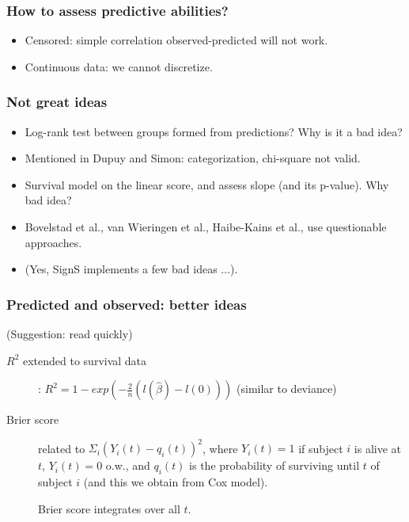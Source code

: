 \begin{frame}
\frametitle{How to assess predictive abilities?}
\begin{itemize}
\item Censored: simple correlation observed-predicted will not work.
\item Continuous data: we cannot discretize.
\end{itemize}
\end{frame}


\begin{frame}
\frametitle{Not great ideas}

\begin{itemize}
\item Log-rank test between groups formed from predictions? Why is it a
  bad idea?
\pause
\item Mentioned in Dupuy and Simon: categorization, chi-square not valid.
\vspace*{10pt}
\pause
\item Survival model on the linear score, and assess slope (and its
  p-value). Why bad idea?
\vspace*{10pt}
\pause
\item Bovelstad et al., van Wieringen et al., Haibe-Kains et al., use
  questionable approaches.

\item (Yes, SignS implements a few bad ideas  $\ldots$).
\end{itemize}
\end{frame}



\begin{frame}[label=brierscore]
\frametitle{Predicted and observed: better ideas}
(Suggestion: read quickly)

\begin{description}
\item[$R^2$ extended to survival data]: $R^2 = 1 -
  exp(-\frac{2}{n}(l(\hat{\beta}) - l(0)))$ (similar to deviance)

\item[Brier score] related to $\Sigma_i (Y_i(t) - q_i(t))^2$, where 
$Y_i(t) = 1$ if subject $i$ is alive at $t$, $Y_i(t) = 0$ o.w., and 
$q_i(t)$ is the probability of surviving until  $t$ of subject $i$ (and
this we obtain from Cox model).

Brier score integrates over all  $t$.
\end{description}
\end{frame}



